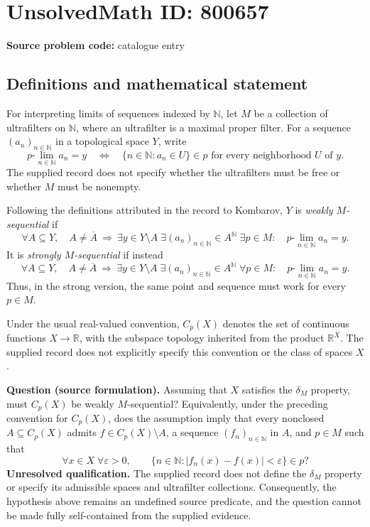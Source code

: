 \documentclass[11pt]{article}
\newcommand{\N}{\mathbb{N}}
\newcommand{\R}{\mathbb{R}}
\begin{document}
\section*{UnsolvedMath ID: 800657}
\textbf{Source problem code:} catalogue entry
\subsection{Definitions and mathematical statement}
For interpreting limits of sequences indexed by \(\N\), let \(M\) be a collection of ultrafilters on \(\N\), where an ultrafilter is a maximal proper filter. For a sequence \((a_n)_{n\in\N}\) in a topological space \(Y\), write
\[
p\text{-}\lim_{n\in\N}a_n=y
\quad\Longleftrightarrow\quad
\{n\in\N:a_n\in U\}\in p
\text{ for every neighborhood }U\text{ of }y.
\]
The supplied record does not specify whether the ultrafilters must be free or whether \(M\) must be nonempty.

Following the definitions attributed in the record to Kombarov, \(Y\) is \emph{weakly \(M\)-sequential} if
\[
\forall A\subseteq Y,\quad
A\ne\overline A
\ \Longrightarrow\
\exists y\in Y\setminus A\;
\exists(a_n)_{n\in\N}\in A^{\N}\;
\exists p\in M:\quad
p\text{-}\lim_{n\in\N}a_n=y.
\]
It is \emph{strongly \(M\)-sequential} if instead
\[
\forall A\subseteq Y,\quad
A\ne\overline A
\ \Longrightarrow\
\exists y\in Y\setminus A\;
\exists(a_n)_{n\in\N}\in A^{\N}\;
\forall p\in M:\quad
p\text{-}\lim_{n\in\N}a_n=y.
\]
Thus, in the strong version, the same point and sequence must work for every \(p\in M\).

Under the usual real-valued convention, \(C_p(X)\) denotes the set of continuous functions \(X\to\R\), with the subspace topology inherited from the product \(\R^X\). The supplied record does not explicitly specify this convention or the class of spaces \(X\).

\textbf{Question (source formulation).} Assuming that \(X\) satisfies the \(\delta_M\) property, must \(C_p(X)\) be weakly \(M\)-sequential? Equivalently, under the preceding convention for \(C_p(X)\), does the assumption imply that every nonclosed \(A\subseteq C_p(X)\) admits \(f\in C_p(X)\setminus A\), a sequence \((f_n)_{n\in\N}\) in \(A\), and \(p\in M\) such that
\[
\forall x\in X\;\forall\varepsilon>0,\qquad
\{n\in\N:|f_n(x)-f(x)|<\varepsilon\}\in p?
\]
\textbf{Unresolved qualification.} The supplied record does not define the \(\delta_M\) property or specify its admissible spaces and ultrafilter collections. Consequently, the hypothesis above remains an undefined source predicate, and the question cannot be made fully self-contained from the supplied evidence.
\end{document}
